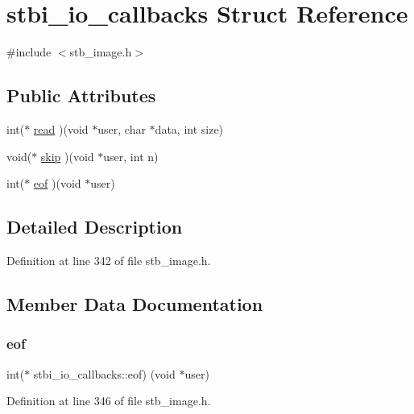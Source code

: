 \hypertarget{structstbi__io__callbacks}{}\section{stbi\+\_\+io\+\_\+callbacks Struct Reference}
\label{structstbi__io__callbacks}


{\ttfamily \#include $<$stb\+\_\+image.\+h$>$}

\subsection*{Public Attributes}
\begin{DoxyCompactItemize}
\item 
int($\ast$ \hyperlink{structstbi__io__callbacks_a623e46b3a2a019611601409926283a88}{read} )(void $\ast$user, char $\ast$data, int size)
\item 
void($\ast$ \hyperlink{structstbi__io__callbacks_a257aac5480a90a6c4b8fbe86c1b01068}{skip} )(void $\ast$user, int n)
\item 
int($\ast$ \hyperlink{structstbi__io__callbacks_a319639db2f76e715eed7a7a974136832}{eof} )(void $\ast$user)
\end{DoxyCompactItemize}


\subsection{Detailed Description}


Definition at line 342 of file stb\+\_\+image.\+h.



\subsection{Member Data Documentation}
\mbox{\label{structstbi__io__callbacks_a319639db2f76e715eed7a7a974136832}} 
\subsubsection{\texorpdfstring{eof}{eof}}
{\footnotesize\ttfamily int($\ast$ stbi\+\_\+io\+\_\+callbacks\+::eof) (void $\ast$user)}



Definition at line 346 of file stb\+\_\+image.\+h.

